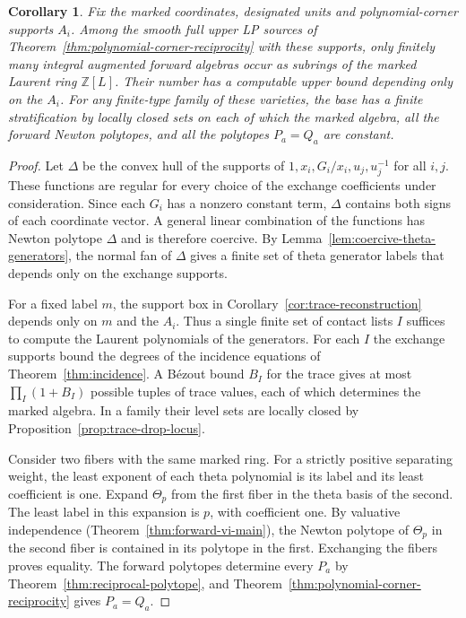 \documentclass[11pt,reqno]{amsart}
\numberwithin{equation}{section}
\newtheorem{corollary}[theorem]{Corollary}
\theoremstyle{definition}
\theoremstyle{remark}
\begin{document}
\begin{corollary}\label{cor:constructible-reciprocal-locus}
Fix the marked coordinates, designated units and polynomial-corner
supports \(A_i\). Among the smooth full upper LP sources of
Theorem~\ref{thm:polynomial-corner-reciprocity} with these supports,
only finitely many integral augmented forward algebras occur as
subrings of the marked Laurent ring \(\mathbb Z[L]\). Their number
has a computable upper bound depending only on the \(A_i\).
For any finite-type family of these varieties, the base has a finite
stratification by locally closed sets on each of which the marked
algebra, all the forward Newton polytopes, and all the polytopes
\(P_a=Q_a\) are constant.
\end{corollary}
\begin{proof}
Let \(\Delta\) be the convex hull of the supports of \(1,x_i,G_i/x_i,u_j,u_j^{-1}\)
for all \(i,j\). These functions are regular for every choice of the
exchange coefficients under consideration. Since each \(G_i\) has a
nonzero constant term, \(\Delta\) contains both signs of each coordinate
vector. A general linear combination of the functions has Newton polytope \(\Delta\)
and is therefore coercive. By Lemma~\ref{lem:coercive-theta-generators},
the normal fan of \(\Delta\) gives a finite set of theta generator
labels that depends only on the exchange supports.

For a fixed label \(m\), the support box in
Corollary~\ref{cor:trace-reconstruction} depends only on \(m\) and
the \(A_i\). Thus a single finite set of contact lists \(I\)
suffices to compute the Laurent polynomials of the
generators. For each \(I\) the exchange supports bound the degrees
of the incidence equations of Theorem~\ref{thm:incidence}.
A B\'ezout bound \(B_I\) for the trace gives at most
\(\prod_I(1+B_I)\) possible tuples of trace values, each of which
determines the marked algebra. In a family their level sets are
locally closed by Proposition~\ref{prop:trace-drop-locus}.

Consider two fibers with the same marked ring. For a strictly
positive separating weight, the least exponent of each theta
polynomial is its label and its least coefficient is one.
Expand \(\Theta_p\) from the first fiber in the theta basis of the
second. The least label in this expansion is \(p\), with coefficient
one. By valuative independence (Theorem~\ref{thm:forward-vi-main}),
the Newton polytope of \(\Theta_p\) in the second fiber is contained
in its polytope in the first. Exchanging the fibers proves equality.
The forward polytopes determine every \(P_a\) by
Theorem~\ref{thm:reciprocal-polytope}, and
Theorem~\ref{thm:polynomial-corner-reciprocity} gives \(P_a=Q_a\).
\end{proof}
\end{document}
